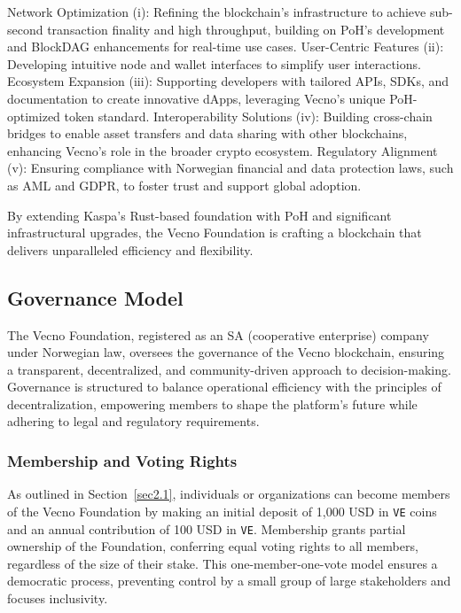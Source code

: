 \documentclass[a4paper,onecolumn,superscriptaddress,10pt]{compositionalityarticle}
\begin{document}
{Network Optimization (i)}: Refining the blockchain’s infrastructure to achieve sub-second transaction finality and high throughput, building on PoH’s development and BlockDAG enhancements for real-time use cases. {User-Centric Features (ii)}: Developing intuitive node and wallet interfaces to simplify user interactions. {Ecosystem Expansion (iii)}: Supporting developers with tailored APIs, SDKs, and documentation to create innovative dApps, leveraging Vecno’s unique PoH-optimized token standard. {Interoperability Solutions (iv)}: Building cross-chain bridges to enable asset transfers and data sharing with other blockchains, enhancing Vecno’s role in the broader crypto ecosystem. {Regulatory Alignment (v)}: Ensuring compliance with Norwegian financial and data protection laws, such as AML and GDPR, to foster trust and support global adoption.

By extending Kaspa’s Rust-based foundation with PoH and significant infrastructural upgrades, the Vecno Foundation is crafting a blockchain that delivers unparalleled efficiency and flexibility. 

\vspace{0.3cm}

\subsection{Governance Model}\label{sec2.5}

The Vecno Foundation, registered as an SA (cooperative enterprise) company under Norwegian law, oversees the governance of the Vecno blockchain, ensuring a transparent, decentralized, and community-driven approach to decision-making. Governance is structured to balance operational efficiency with the principles of decentralization, empowering members to shape the platform’s future while adhering to legal and regulatory requirements.

\subsubsection{Membership and Voting Rights}
As outlined in Section~\ref{sec2.1}, individuals or organizations can become members of the Vecno Foundation by making an initial deposit of 1,000 USD in \texttt{VE} coins and an annual contribution of 100 USD in \texttt{VE}. Membership grants partial ownership of the Foundation, conferring equal voting rights to all members, regardless of the size of their stake. This one-member-one-vote model ensures a democratic process, preventing control by a small group of large stakeholders and focuses inclusivity.
\end{document}
